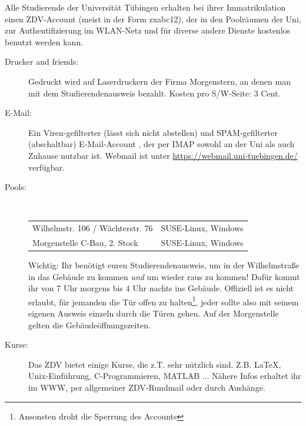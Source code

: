 Alle Studierende der Universität Tübingen erhalten bei ihrer Immatrikulation einen ZDV-Account (meist in der Form zxabc12), der in den Poolräumen der Uni, zur Authentifizierung im WLAN-Netz und für diverse andere Dienste kostenlos benutzt werden kann.

\begin{description}

  \item[Drucker and friends:]
    Gedruckt wird auf Laserdruckern der Firma Morgenstern, an denen man mit dem Studierendenausweis bezahlt. Kosten pro S/W-Seite:
    3 Cent.

  \item[E-Mail:]
    Ein Viren-gefilterter (lässt sich nicht abstellen) und SPAM-gefilterter
    (abschaltbar) E-Mail-Account ,
    der per IMAP sowohl an der Uni als auch Zuhause nutzbar ist. Webmail ist unter \url{https://webmail.uni-tuebingen.de/} verfügbar. 

  \item[Pools:] ~\\
    \begin{tabular}{ll}
      Wilhelmstr. 106 / Wächterstr. 76 &                SUSE-Linux, Windows \\
      Morgenstelle C-Bau, 2. Stock &            SUSE-Linux, Windows \\
    \end{tabular}

    Wichtig: Ihr benötigt euren Studierendenausweis, um in der Wilhelmstraße in das Gebäude zu kommen \emph{und} um wieder raus zu kommen! Dafür kommt ihr von 7 Uhr morgens bis 4 Uhr nachts ins Gebäude. Offiziell ist es nicht erlaubt, für jemanden die Tür offen zu halten\footnote{Ansonsten droht die Sperrung des Accounts}, jeder sollte also mit seinem eigenen Ausweis einzeln durch die Türen gehen. Auf der Morgenstelle gelten die Gebäudeöffnungszeiten.

  \item[Kurse:]
    Das ZDV bietet einige Kurse, die z.T. sehr nützlich sind. Z.B. \LaTeX,
    Unix-Ein\-führ\-ung, C-Programmieren, MATLAB ... Nähere Infos erhaltet ihr im
    WWW, per allgemeiner ZDV-Rundmail oder durch Aushänge.


\end{description}
